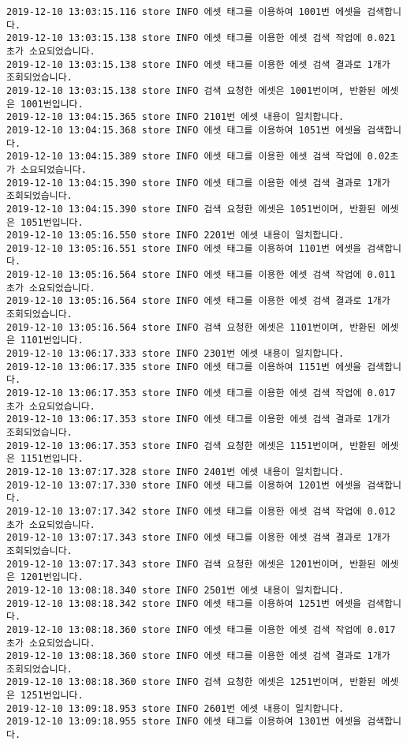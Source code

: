 \begin{Verbatim}[fontsize=\tiny, breaklines=true, breakanywhere=true]
2019-12-10 13:03:15.116 store INFO 에셋 태그를 이용하여 1001번 에셋을 검색합니다.
2019-12-10 13:03:15.138 store INFO 에셋 태그를 이용한 에셋 검색 작업에 0.021초가 소요되었습니다.
2019-12-10 13:03:15.138 store INFO 에셋 태그를 이용한 에셋 검색 결과로 1개가 조회되었습니다.
2019-12-10 13:03:15.138 store INFO 검색 요청한 에셋은 1001번이며, 반환된 에셋은 1001번입니다.
2019-12-10 13:04:15.365 store INFO 2101번 에셋 내용이 일치합니다.
2019-12-10 13:04:15.368 store INFO 에셋 태그를 이용하여 1051번 에셋을 검색합니다.
2019-12-10 13:04:15.389 store INFO 에셋 태그를 이용한 에셋 검색 작업에 0.02초가 소요되었습니다.
2019-12-10 13:04:15.390 store INFO 에셋 태그를 이용한 에셋 검색 결과로 1개가 조회되었습니다.
2019-12-10 13:04:15.390 store INFO 검색 요청한 에셋은 1051번이며, 반환된 에셋은 1051번입니다.
2019-12-10 13:05:16.550 store INFO 2201번 에셋 내용이 일치합니다.
2019-12-10 13:05:16.551 store INFO 에셋 태그를 이용하여 1101번 에셋을 검색합니다.
2019-12-10 13:05:16.564 store INFO 에셋 태그를 이용한 에셋 검색 작업에 0.011초가 소요되었습니다.
2019-12-10 13:05:16.564 store INFO 에셋 태그를 이용한 에셋 검색 결과로 1개가 조회되었습니다.
2019-12-10 13:05:16.564 store INFO 검색 요청한 에셋은 1101번이며, 반환된 에셋은 1101번입니다.
2019-12-10 13:06:17.333 store INFO 2301번 에셋 내용이 일치합니다.
2019-12-10 13:06:17.335 store INFO 에셋 태그를 이용하여 1151번 에셋을 검색합니다.
2019-12-10 13:06:17.353 store INFO 에셋 태그를 이용한 에셋 검색 작업에 0.017초가 소요되었습니다.
2019-12-10 13:06:17.353 store INFO 에셋 태그를 이용한 에셋 검색 결과로 1개가 조회되었습니다.
2019-12-10 13:06:17.353 store INFO 검색 요청한 에셋은 1151번이며, 반환된 에셋은 1151번입니다.
2019-12-10 13:07:17.328 store INFO 2401번 에셋 내용이 일치합니다.
2019-12-10 13:07:17.330 store INFO 에셋 태그를 이용하여 1201번 에셋을 검색합니다.
2019-12-10 13:07:17.342 store INFO 에셋 태그를 이용한 에셋 검색 작업에 0.012초가 소요되었습니다.
2019-12-10 13:07:17.343 store INFO 에셋 태그를 이용한 에셋 검색 결과로 1개가 조회되었습니다.
2019-12-10 13:07:17.343 store INFO 검색 요청한 에셋은 1201번이며, 반환된 에셋은 1201번입니다.
2019-12-10 13:08:18.340 store INFO 2501번 에셋 내용이 일치합니다.
2019-12-10 13:08:18.342 store INFO 에셋 태그를 이용하여 1251번 에셋을 검색합니다.
2019-12-10 13:08:18.360 store INFO 에셋 태그를 이용한 에셋 검색 작업에 0.017초가 소요되었습니다.
2019-12-10 13:08:18.360 store INFO 에셋 태그를 이용한 에셋 검색 결과로 1개가 조회되었습니다.
2019-12-10 13:08:18.360 store INFO 검색 요청한 에셋은 1251번이며, 반환된 에셋은 1251번입니다.
2019-12-10 13:09:18.953 store INFO 2601번 에셋 내용이 일치합니다.
2019-12-10 13:09:18.955 store INFO 에셋 태그를 이용하여 1301번 에셋을 검색합니다.

\end{Verbatim}
